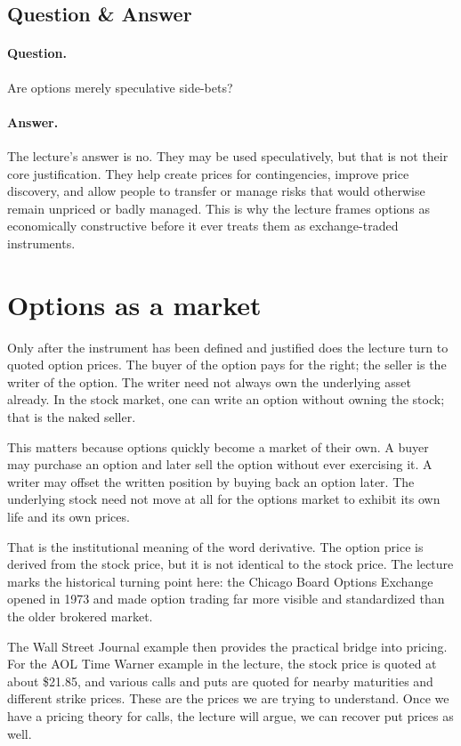\subsection{Question \& Answer}

\paragraph{Question.} Are options merely speculative side-bets?

\paragraph{Answer.} The lecture's answer is no. They may be used speculatively, but that is not their core justification. They help create prices for contingencies, improve price discovery, and allow people to transfer or manage risks that would otherwise remain unpriced or badly managed. This is why the lecture frames options as economically constructive before it ever treats them as exchange-traded instruments.

\section{Options as a market}

Only after the instrument has been defined and justified does the lecture turn to quoted option prices. The buyer of the option pays for the right; the seller is the writer of the option. The writer need not always own the underlying asset already. In the stock market, one can write an option without owning the stock; that is the naked seller.

This matters because options quickly become a market of their own. A buyer may purchase an option and later sell the option without ever exercising it. A writer may offset the written position by buying back an option later. The underlying stock need not move at all for the options market to exhibit its own life and its own prices.

That is the institutional meaning of the word derivative. The option price is derived from the stock price, but it is not identical to the stock price. The lecture marks the historical turning point here: the Chicago Board Options Exchange opened in 1973 and made option trading far more visible and standardized than the older brokered market.

The Wall Street Journal example then provides the practical bridge into pricing. For the AOL Time Warner example in the lecture, the stock price is quoted at about \$21.85, and various calls and puts are quoted for nearby maturities and different strike prices. These are the prices we are trying to understand. Once we have a pricing theory for calls, the lecture will argue, we can recover put prices as well.

